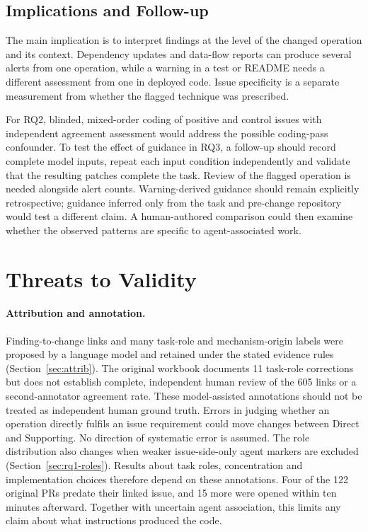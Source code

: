 \documentclass[acmsmall,screen,nonacm]{acmart}
\begin{document}
\subsection{Implications and Follow-up}

The main implication is to interpret findings at the level of the changed operation and its context. Dependency updates and data-flow reports can produce several alerts from one operation, while a warning in a test or README needs a different assessment from one in deployed code. Issue specificity is a separate measurement from whether the flagged technique was prescribed.

For RQ2, blinded, mixed-order coding of positive and control issues with independent agreement assessment would address the possible coding-pass confounder. To test the effect of guidance in RQ3, a follow-up should record complete model inputs, repeat each input condition independently and validate that the resulting patches complete the task. Review of the flagged operation is needed alongside alert counts. Warning-derived guidance should remain explicitly retrospective; guidance inferred only from the task and pre-change repository would test a different claim. A human-authored comparison could then examine whether the observed patterns are specific to agent-associated work.

\section{Threats to Validity}\label{sec:threats}

\paragraph{Attribution and annotation.} Finding-to-change links and many task-role and mechanism-origin labels were proposed by a language model and retained under the stated evidence rules (Section~\ref{sec:attrib}). The original workbook documents 11 task-role corrections but does not establish complete, independent human review of the 605 links or a second-annotator agreement rate. These model-assisted annotations should not be treated as independent human ground truth. Errors in judging whether an operation directly fulfils an issue requirement could move changes between Direct and Supporting. No direction of systematic error is assumed. The role distribution also changes when weaker issue-side-only agent markers are excluded (Section~\ref{sec:rq1-roles}). Results about task roles, concentration and implementation choices therefore depend on these annotations. Four of the 122 original PRs predate their linked issue, and 15 more were opened within ten minutes afterward. Together with uncertain agent association, this limits any claim about what instructions produced the code.
\end{document}
